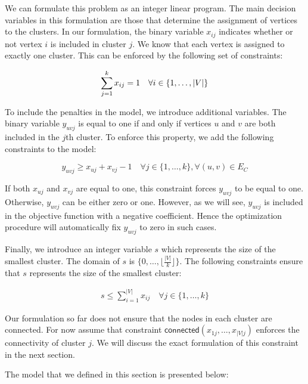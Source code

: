 \documentclass[conference,compsoc]{IEEEtran}
\begin{document}
We can formulate this problem as an integer linear program. The main
decision variables in this formulation are those that determine the
assignment of vertices to the clusters. In our formulation, the binary
variable $x_{ij}$ indicates whether or not vertex $i$ is included in
cluster $j$. We know that each vertex is assigned to exactly one
cluster. This can be enforced by the following set of constraints:

\begin{equation}
\sum_{j=1}^k x_{ij} = 1 \quad \forall i \in \{1, \ldots, |V|\} \label{cons:assign}\\
\end{equation}

To include the penalties in the model, we introduce additional
variables. The binary variable $y_{uvj}$ is equal to one if and only if
vertices $u$ and $v$ are both included in the $j$th cluster. To enforce
this property, we add the following constraints to the model:

\begin{equation}
y_{uvj} \geq x_{uj} + x_{vj} -1 \quad \forall j \in \{1, \ldots, k\}, \forall (u, v) \in E_{C}
\end{equation}

If both $x_{uj}$ and $x_{vj}$ are equal to one, this constraint forces
$y_{uvj}$ to be equal to one. Otherwise, $y_{uvj}$ can be either zero or
one. However, as we will see, $y_{uvj}$ is included in the objective
function with a negative coefficient. Hence the optimization procedure
will automatically fix $y_{uvj}$ to zero in such cases.

Finally, we introduce an integer variable $s$ which represents the size
of the smallest cluster. The domain of $s$ is
$\{0, \ldots, \lfloor \frac{|V|}{k} \rfloor \}$. The following constraints
ensure that $s$ represents the size of the smallest cluster:

\begin{align}
s \leq \sum_{i=1}^{|V|} x_{ij} \quad \forall j \in \{1, \ldots, k\}
\end{align}

Our formulation so far does not ensure that the nodes in each cluster
are connected. For now assume that constraint
$\mathsf{connected}(x_{1j}, \ldots, x_{|V|j})$ enforces the connectivity of
cluster $j$. We will discuss the exact formulation of this constraint in
the next section. 

The model that we defined in this section is presented
below:
\end{document}
